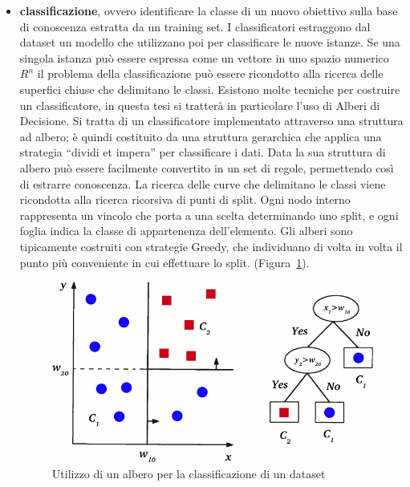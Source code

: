 \begin{itemize}
\item \textbf{classificazione}, ovvero identificare la classe di un nuovo obiettivo sulla base di conoscenza estratta da un training set. I classificatori estraggono dal dataset un modello che utilizzano poi per classificare le nuove istanze. Se una singola istanza può essere espressa come un vettore in uno spazio numerico $R^n$ il problema della classificazione può essere ricondotto alla ricerca delle superfici chiuse che delimitano le classi. Esistono molte tecniche per costruire un classificatore, in questa tesi si tratterà in particolare l'uso di Alberi di Decisione. Si tratta di un classificatore implementato attraverso una struttura ad albero; è quindi costituito da una struttura gerarchica che applica una strategia “dividi et impera” per classificare i dati. Data la sua struttura di albero può essere facilmente convertito in un set di regole, permettendo così di estrarre conoscenza. La ricerca delle curve che delimitano le classi viene ricondotta alla ricerca ricorsiva di punti di split.
Ogni nodo interno rappresenta un vincolo che porta a una scelta determinando uno split, e ogni foglia indica la classe di appartenenza dell'elemento. Gli alberi sono tipicamente costruiti con strategie Greedy, che individuano di volta in volta il punto più conveniente in cui effettuare lo split. (Figura~\ref{fig:alberoastratto}).

\begin{figure}[!h]
	\centering
	\includegraphics[width=\columnwidth]{figures/AlberoAstratto.png}
	\caption{Utilizzo di un albero per la classificazione di un dataset \label{fig:alberoastratto}}
\end{figure} 


\end{itemize}
